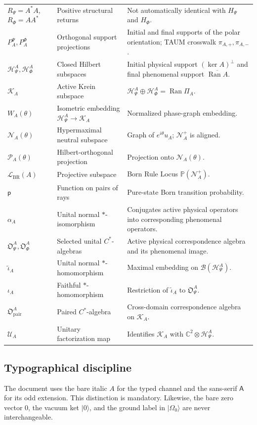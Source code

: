 \documentclass[11pt,reqno]{scrartcl}
\newcommand{\PiA}{\Pi_{A}}
\newcommand{\ket}[1]{\lvert #1\rangle}
\newcommand{\actHP}{\mathscr H_{\Psi}^{A}}
\newcommand{\actHF}{\mathscr H_{\Phi}^{A}}
\newcommand{\actK}{\mathscr K_{A}}
\newcommand{\suppProjP}{P_{A}^{\Psi}}
\newcommand{\suppProjF}{P_{A}^{\Phi}}
\newcommand{\NAplus}{\mathscr N_{A}^{+}}
\newcommand{\NAtheta}{\mathscr N_{A}(\theta)}
\newcommand{\WAtheta}{W_{A}(\theta)}
\newcommand{\LBR}{\mathscr L_{\mathrm{BR}}(A)}
\newcommand{\alphaA}{\alpha_{A}}
\newcommand{\iotaA}{\iota_{A}}
\newcommand{\iotaMaxA}{\widetilde{\iota}_{A}}
\newcommand{\obsP}{\mathfrak O_{\Psi}^{A}}
\newcommand{\obsF}{\mathfrak O_{\Phi}^{A}}
\newcommand{\obsPair}{\mathfrak O_{\mathrm{pair}}^{A}}
\newcommand{\UA}{\mathcal U_{A}}
\newcommand{\PAtheta}{\mathcal P_{A}(\theta)}
\newcommand{\BRprob}{\mathsf p}
\theoremstyle{plain}
\theoremstyle{definition}
\theoremstyle{remark}
\begin{document}
\begin{longtable}{>{\raggedright\arraybackslash}p{}
>{\raggedright\arraybackslash}p{}
>{\raggedright\arraybackslash}p{}}
$R_{\Psi}=A^*A$, $R_{\Phi}=AA^*$ & Positive structural returns & Not automatically identical with $H_{\Psi}$ and $H_{\Phi}$. \\
$\suppProjP,\suppProjF$ & Orthogonal support projections & Initial and final supports of the polar orientation; TAUM crosswalk $\pi_{A,+},\pi_{A,-}$. \\
$\actHP,\actHF$ & Closed Hilbert subspaces & Initial physical support $(\ker A)^\perp$ and final phenomenal support $\overline{\operatorname{Ran}A}$. \\
$\actK$ & Active Krein subspace & $\actHP\oplus\actHF=\operatorname{Ran}\PiA$. \\
$\WAtheta$ & Isometric embedding $\actHP\to\actK$ & Normalized phase-graph embedding. \\
$\NAtheta$ & Hypermaximal neutral subspace & Graph of $e^{i\theta}u_A$; $\NAplus$ is aligned. \\
$\PAtheta$ & Hilbert-orthogonal projection & Projection onto $\NAtheta$. \\
$\LBR$ & Projective subspace & Born Rule Locus $\mathbb P(\NAplus)$. \\
$\BRprob$ & Function on pairs of rays & Pure-state Born transition probability. \\
$\alphaA$ & Unital normal $*$-isomorphism & Conjugates active physical operators into corresponding phenomenal operators. \\
$\obsP,\obsF$ & Selected unital $C^*$-algebras & Active physical correspondence algebra and its phenomenal image. \\
$\iotaMaxA$ & Unital normal $*$-homomorphism & Maximal embedding on $\mathcal B(\actHP)$. \\
$\iotaA$ & Faithful $*$-homomorphism & Restriction of $\iotaMaxA$ to $\obsP$. \\
$\obsPair$ & Paired $C^*$-algebra & Cross-domain correspondence algebra on $\actK$. \\
$\UA$ & Unitary factorization map & Identifies $\actK$ with $\mathbb C^2\otimes\actHP$. \\
\bottomrule
\end{longtable}

\subsection{Typographical discipline}

The document uses the bare italic $A$ for the typed channel and the
sans-serif $\mathsf A$ for its odd extension.  This distinction is mandatory.
Likewise, the bare zero vector $0$, the vacuum ket $\ket0$, and the ground
label in $\ket{\Omega_0}$ are never interchangeable.
\end{document}
